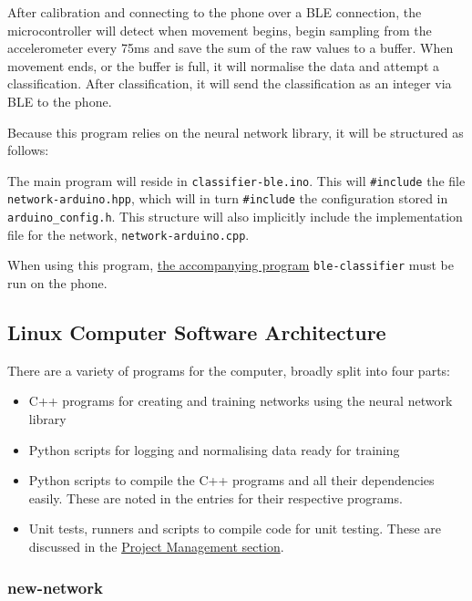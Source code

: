 \documentclass[a4paper]{article}
\begin{document}
After calibration and connecting to the phone over a BLE connection, the microcontroller will detect when movement begins, begin sampling from the accelerometer every 75ms and save the sum of the raw values to a buffer. When movement ends, or the buffer is full, it will normalise the data and attempt a classification. After classification, it will send the classification as an integer via BLE to the phone.

Because this program relies on the neural network library, it will be structured as follows:

The main program will reside in \lstinline{classifier-ble.ino}. This will \lstinline{#include} the file \lstinline{network-arduino.hpp}, which will in turn \lstinline{#include} the configuration stored in \lstinline{arduino_config.h}. 
This structure will also implicitly include the implementation file for the network, \lstinline{network-arduino.cpp}.


When using this program, \hyperref[subsubsec:dc_asa_classifier]{the accompanying program} \lstinline{ble-classifier} must be run on the phone.

\subsection{Linux Computer Software Architecture}%
\label{subsec:dc_csa}


There are a variety of programs for the computer, broadly split into four parts:

\begin{itemize}
\item C++ programs for creating and training networks using the neural network library
\item Python scripts for logging and normalising data ready for training
\item Python scripts to compile the C++ programs and all their dependencies easily. These are noted in the entries for their respective programs.
\item Unit tests, runners and scripts to compile code for unit testing. These are discussed in the \hyperref[subsec:pp_testing]{Project Management section}.
\end{itemize}

\subsubsection{new-network}%
\label{subsubsec:dc_cas_newnetwork}
\end{document}
